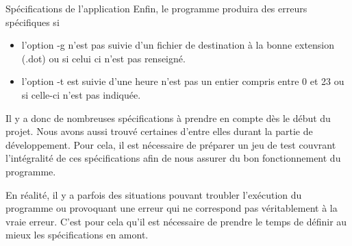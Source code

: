 \documentclass[11pt]{article}
\begin{document}
\begin{section}{Spécifications de l'application}
Enfin, le programme produira des erreurs spécifiques si 
\begin{itemize}
\item l'option -g n'est pas suivie d'un fichier de destination à la bonne extension (.dot) ou si celui ci n'est pas renseigné.
\item l'option -t est suivie d'une heure n'est pas un entier compris entre 0 et 23 ou si celle-ci n'est pas indiquée.
\newline
\end{itemize} 



Il y a donc de nombreuses spécifications à prendre en compte dès le début du projet. Nous avons aussi trouvé certaines d'entre elles durant la partie de développement. Pour cela, il est nécessaire de préparer un jeu de test couvrant l'intégralité de ces spécifications afin de nous assurer du bon fonctionnement du programme.

En réalité, il y a parfois des situations pouvant troubler l'exécution du programme ou provoquant une erreur qui ne correspond pas véritablement à la vraie erreur. C'est pour cela qu'il est nécessaire de prendre le temps de définir au mieux les spécifications en amont.

\begin{figure}[h]
\begin{center}
\renewcommand{\arraystretch}{1.1} 


\end{center}
\end{figure}
\end{section}
\end{document}
